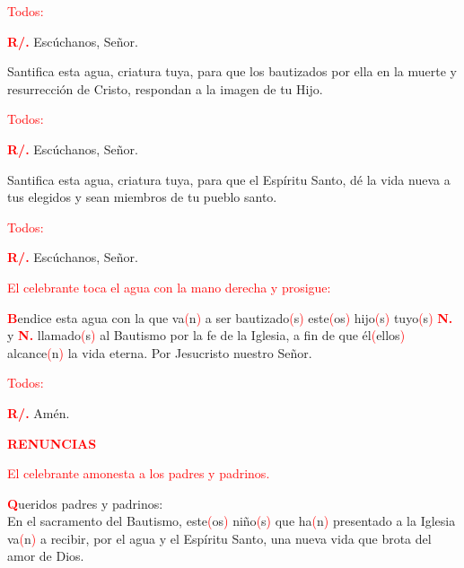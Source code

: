 \documentclass[12pt, letterpaper]{report}
\begin{document}
\large {\textcolor{red}{Todos:}}

\Large {\bfseries \textcolor{red}{R/.}} \hspace{0.5cm} Esc\'uchanos, Se\~nor.

\noindent
\Large Santifica esta agua, criatura tuya, para que los bautizados por ella en la muerte y resurrecci\'on de Cristo, respondan a la imagen de tu Hijo.

\large {\textcolor{red}{Todos:}}

\Large {\bfseries \textcolor{red}{R/.}} \hspace{0.5cm} Esc\'uchanos, Se\~nor.

\noindent
\Large Santifica esta agua, criatura tuya, para que el Esp\'iritu Santo, d\'e la vida nueva a tus elegidos y sean miembros de tu pueblo santo.

\large {\textcolor{red}{Todos:}}

\Large {\bfseries \textcolor{red}{R/.}} \hspace{0.5cm} Esc\'uchanos, Se\~nor.

\large {\textcolor{red}{El celebrante toca el agua con la mano derecha y prosigue:}}

\lettrine[lines=1]{\bfseries \textcolor{red}{B}}{}\Large endice \Huge{\textcolor{red}{}} \Large esta agua con la que va\textcolor{red}{(}n\textcolor{red}{)} a ser bautizado\textcolor{red}{(}s\textcolor{red}{)} este\textcolor{red}{(}os\textcolor{red}{)} hijo\textcolor{red}{(}s\textcolor{red}{)} tuyo\textcolor{red}{(}s\textcolor{red}{)} {\bfseries \textcolor{red}{N.}} y {\bfseries \textcolor{red}{N.}} llamado\textcolor{red}{(}s\textcolor{red}{)} al Bautismo por la fe de la Iglesia, a fin de que \'el\textcolor{red}{(}ellos\textcolor{red}{)} alcance\textcolor{red}{(}n\textcolor{red}{)} la vida eterna. Por Jesucristo nuestro Se\~nor.

\large {\textcolor{red}{Todos:}}

\Large {\bfseries \textcolor{red}{R/.}} \hspace{0.5cm} Am\'en.

\Large {\bfseries \textcolor{red}{RENUNCIAS}}

\large {\textcolor{red}{El celebrante amonesta a los padres y padrinos.}}

\lettrine[lines=1]{\bfseries \textcolor{red}{Q}}{}\Large ueridos padres y padrinos: \\ En el sacramento del Bautismo, este\textcolor{red}{(}os\textcolor{red}{)} ni\~no\textcolor{red}{(}s\textcolor{red}{)} que ha\textcolor{red}{(}n\textcolor{red}{)} presentado a la Iglesia va\textcolor{red}{(}n\textcolor{red}{)} a recibir, por el agua y el Esp\'iritu Santo, una nueva vida que brota del amor de Dios.
\end{document}
